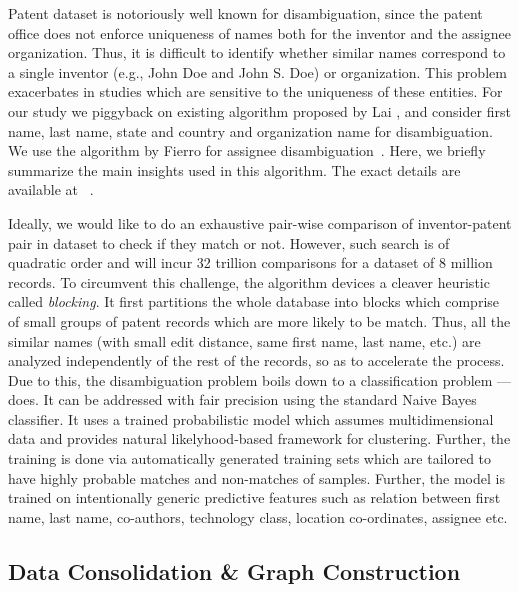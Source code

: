 
Patent dataset is notoriously well known for disambiguation, since the patent office does not enforce uniqueness of names both for the inventor and the assignee organization. Thus, it is difficult to identify whether similar names correspond to a single inventor (e.g., John Doe and John S. Doe) or organization. This problem exacerbates in studies which are sensitive to the uniqueness of these entities.
For our study we piggyback on existing algorithm proposed by Lai \etal, and consider first name, last name, state and country and organization name for disambiguation.
We use the algorithm by Fierro \etal for assignee disambiguation~\cite{newdisambiguation}.
Here, we briefly summarize the main insights used in this algorithm. The exact details are available at ~\cite{disambiguation}. 

Ideally, we would like to do an exhaustive pair-wise comparison of inventor-patent pair in dataset to check if they match or not. However, such search is of quadratic order and will incur 32 trillion comparisons for a dataset of 8 million records. 
To circumvent this challenge, the algorithm devices a cleaver heuristic called {\em blocking}. 
It first partitions the whole database into blocks which comprise of small groups of patent records which are more likely to be match. Thus, all the similar names (with small edit distance, same first name, last name, etc.) are 
analyzed independently of the rest of the records, so as to accelerate the process. Due to this, the disambiguation problem boils down to a classification problem --- does. It can be addressed with fair precision using the standard Naive Bayes classifier. 
It uses a trained probabilistic model which assumes multidimensional data and provides natural likelyhood-based framework for clustering. Further, the training is done via automatically generated training sets which are tailored to have highly probable matches and non-matches of samples. Further, the model is trained on intentionally generic predictive features such as relation between first name, last name, co-authors, technology class, location co-ordinates, assignee etc. 

\subsection{Data Consolidation \& Graph Construction}

